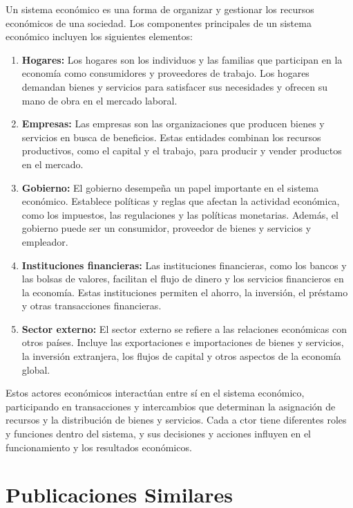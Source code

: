 \documentclass[
  jou,
  floatsintext,
  longtable,
  a4paper,
  nolmodern,
  notxfonts,
  notimes,
  colorlinks=true,linkcolor=blue,citecolor=blue,urlcolor=blue]{apa7}
\begin{document}
Un sistema económico es una forma de organizar y gestionar los recursos
económicos de una sociedad. Los componentes principales de un sistema
económico incluyen los siguientes elementos:

\begin{enumerate}
\def\labelenumi{\arabic{enumi}.}
\item
  \textbf{Hogares:} Los hogares son los individuos y las familias que
  participan en la economía como consumidores y proveedores de trabajo.
  Los hogares demandan bienes y servicios para satisfacer sus
  necesidades y ofrecen su mano de obra en el mercado laboral.
\item
  \textbf{Empresas:} Las empresas son las organizaciones que producen
  bienes y servicios en busca de beneficios. Estas entidades combinan
  los recursos productivos, como el capital y el trabajo, para producir
  y vender productos en el mercado.
\item
  \textbf{Gobierno:} El gobierno desempeña un papel importante en el
  sistema económico. Establece políticas y reglas que afectan la
  actividad económica, como los impuestos, las regulaciones y las
  políticas monetarias. Además, el gobierno puede ser un consumidor,
  proveedor de bienes y servicios y empleador.
\item
  \textbf{Instituciones financieras:} Las instituciones financieras,
  como los bancos y las bolsas de valores, facilitan el flujo de dinero
  y los servicios financieros en la economía. Estas instituciones
  permiten el ahorro, la inversión, el préstamo y otras transacciones
  financieras.
\item
  \textbf{Sector externo:} El sector externo se refiere a las relaciones
  económicas con otros países. Incluye las exportaciones e importaciones
  de bienes y servicios, la inversión extranjera, los flujos de capital
  y otros aspectos de la economía global.
\end{enumerate}

Estos actores económicos interactúan entre sí en el sistema económico,
participando en transacciones y intercambios que determinan la
asignación de recursos y la distribución de bienes y servicios. Cada a
ctor tiene diferentes roles y funciones dentro del sistema, y sus
decisiones y acciones influyen en el funcionamiento y los resultados
económicos.

\section{Publicaciones Similares}\label{publicaciones-similares}
\end{document}
